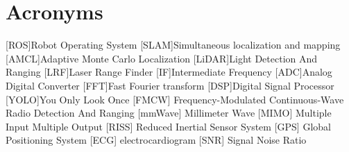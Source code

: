 \chapter*{Acronyms}
	\begin{acronym}[RELAX NG]
	[ROS]{Robot Operating System}
	[SLAM]{Simultaneous localization and mapping}
    [AMCL]{Adaptive Monte Carlo Localization}
    [LiDAR]{Light Detection And Ranging}
	[LRF]{Laser Range Finder}
	[IF]{Intermediate Frequency}
	[ADC]{Analog Digital Converter}
	[FFT]{Fast Fourier transform}
    [DSP]{Digital Signal Processor}
	[YOLO]{You Only Look Once}
	 [FMCW] {Frequency-Modulated Continuous-Wave}
	 {Radio Detection And Ranging}
	[mmWave] {Millimeter Wave}
	[MIMO] {Multiple Input Multiple Output}
	[RISS] {Reduced Inertial Sensor System}
	[GPS] {Global Positioning System}
	[ECG] {electrocardiogram}
	[SNR] {Signal Noise Ratio}
	\end{acronym}